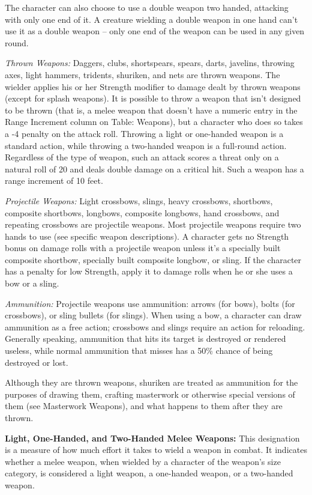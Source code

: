 The character can also choose to use a double weapon two handed, attacking with 
only one end of it. A creature wielding a double weapon in one hand can't use it 
as a double weapon -- only one end of the weapon can be used in any given round.

\textit{Thrown Weapons:} Daggers, clubs, shortspears, spears, darts, javelins, 
throwing axes, light hammers, tridents, shuriken, and nets are thrown weapons. 
The wielder applies his or her Strength modifier to damage dealt by thrown weapons 
(except for splash weapons). It is possible to throw a weapon that isn't designed 
to be thrown (that is, a melee weapon that doesn't have a numeric entry in the 
Range Increment column on Table: Weapons), but a character who does so takes a 
-4 penalty on the attack roll. Throwing a light or one-handed weapon is a standard 
action, while throwing a two-handed weapon is a full-round action. Regardless of 
the type of weapon, such an attack scores a threat only on a natural roll of 20 
and deals double damage on a critical hit. Such a weapon has a range increment 
of 10 feet.

\textit{Projectile Weapons:} Light crossbows, slings, heavy crossbows, shortbows, 
composite shortbows, longbows, composite longbows, hand crossbows, and repeating 
crossbows are projectile weapons. Most projectile weapons require two hands to 
use (see specific weapon descriptions). A character gets no Strength bonus on damage 
rolls with a projectile weapon unless it's a specially built composite shortbow, 
specially built composite longbow, or sling. If the character has a penalty for 
low Strength, apply it to damage rolls when he or she uses a bow or a sling.

\textit{Ammunition:} Projectile weapons use ammunition: arrows (for bows), bolts 
(for crossbows), or sling bullets (for slings). When using a bow, a character can 
draw ammunition as a free action; crossbows and slings require an action for reloading. 
Generally speaking, ammunition that hits its target is destroyed or rendered useless, 
while normal ammunition that misses has a 50\% chance of being destroyed or lost.

Although they are thrown weapons, shuriken are treated as ammunition for the purposes 
of drawing them, crafting masterwork or otherwise special versions of them (see 
Masterwork Weapons), and what happens to them after they are thrown.

\vspace{12pt}
\textbf{Light, One-Handed, and Two-Handed Melee Weapons:} This designation is a 
measure of how much effort it takes to wield a weapon in combat. It indicates whether 
a melee weapon, when wielded by a character of the weapon's size category, is considered 
a light weapon, a one-handed weapon, or a two-handed weapon.

